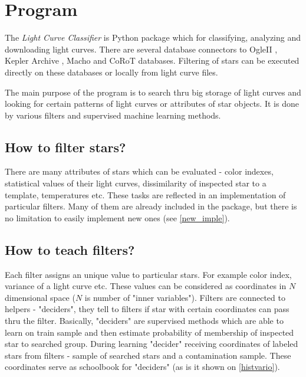 \documentclass[final,5p,times,twocolumn,authoryear]{elsarticle}
\begin{document}

\section{Program}

The \textit{Light Curve Classifier} is Python package which for classifying, analyzing and downloading light curves. There are several database connectors to OgleII \citet{ogleII}, Kepler Archive \cite{kepler}, Macho \cite{macho} and CoRoT \cite{corot} databases. Filtering of stars can be executed directly on these databases or locally from light curve files. 

The main purpose of the program is to search thru big storage of light curves and looking for certain patterns of light curves or attributes of star objects. It is done by various filters and supervised machine learning methods.

\subsection{How to filter stars?}

There are many attributes of stars which can be evaluated - color indexes, statistical values of their light curves, dissimilarity of inspected star to a template, temperatures etc. These tasks are reflected in an implementation of particular filters. Many of them are already included in the package, but there is no limitation to easily implement new ones (see \ref{new_imple}).

\subsection{How to teach filters?}

Each filter assigns an unique value to particular stars. For example color index, variance of a light curve etc. These values can be considered as coordinates in $N$ dimensional space ($N$ is number of "inner variables"). Filters are connected to helpers - "deciders", they tell to filters if star with certain coordinates can pass thru the filter. Basically, "deciders" are supervised methods which are able to learn on train sample and then estimate probability of membership of inspected star to searched group. During learning "decider" receiving coordinates of labeled stars from filters - sample of searched stars and a contamination sample. These coordinates serve as schoolbook for "deciders" (as is it shown on \ref{histvario}).
\end{document}
